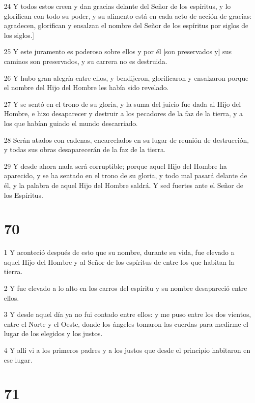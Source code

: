 \par 24 Y todos estos creen y dan gracias delante del Señor de los espíritus, y lo glorifican con todo su poder, y su alimento está en cada acto de acción de gracias: agradecen, glorifican y ensalzan el nombre del Señor de los espíritus por siglos de los siglos.]
\par 25 Y este juramento es poderoso sobre ellos y por él [son preservados y] sus caminos son preservados, y su carrera no es destruida.
\par 26 Y hubo gran alegría entre ellos, y bendijeron, glorificaron y ensalzaron porque el nombre del Hijo del Hombre les había sido revelado.
\par 27 Y se sentó en el trono de su gloria, y la suma del juicio fue dada al Hijo del Hombre, e hizo desaparecer y destruir a los pecadores de la faz de la tierra, y a los que habían guiado el mundo descarriado.
\par 28 Serán atados con cadenas, encarcelados en su lugar de reunión de destrucción, y todas sus obras desaparecerán de la faz de la tierra.
\par 29 Y desde ahora nada será corruptible; porque aquel Hijo del Hombre ha aparecido, y se ha sentado en el trono de su gloria, y todo mal pasará delante de él, y la palabra de aquel Hijo del Hombre saldrá. Y sed fuertes ante el Señor de los Espíritus.

\chapter{70}

\par 1 Y aconteció después de esto que su nombre, durante su vida, fue elevado a aquel Hijo del Hombre y al Señor de los espíritus de entre los que habitan la tierra.
\par 2 Y fue elevado a lo alto en los carros del espíritu y su nombre desapareció entre ellos.
\par 3 Y desde aquel día ya no fui contado entre ellos: y me puso entre los dos vientos, entre el Norte y el Oeste, donde los ángeles tomaron las cuerdas para medirme el lugar de los elegidos y los justos.
\par 4 Y allí vi a los primeros padres y a los justos que desde el principio habitaron en ese lugar.

\chapter{71}

